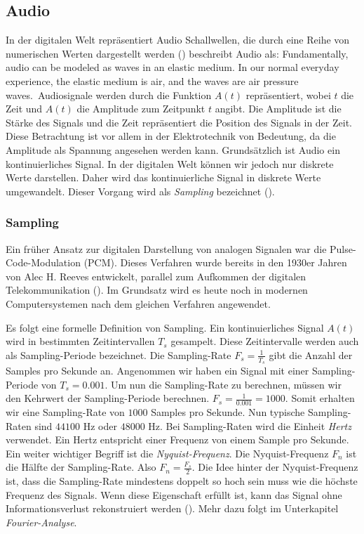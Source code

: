 \documentclass[11pt,a4paper]{article}
\begin{document}
\subsection{Audio}
In der digitalen Welt repräsentiert Audio Schallwellen, die durch eine Reihe von numerischen Werten
dargestellt werden (\cite[p.9]{somberg2019audioapi}) beschreibt Audio als: \glqq Fundamentally,
audio can be modeled as waves in an elastic medium. In our normal everyday experience, the elastic
medium is air, and the waves are air pressure waves.\grqq \ Audiosignale werden durch die Funktion
\(A(t)\) repräsentiert, wobei \(t\) die Zeit und \(A(t)\) die Amplitude zum
Zeitpunkt \(t\) angibt. Die Amplitude ist die Stärke des Signals und die Zeit repräsentiert die
Position des Signals in der Zeit. Diese Betrachtung ist vor allem in der Elektrotechnik
von Bedeutung, da die Amplitude als Spannung angesehen werden kann. Grundsätzlich ist Audio ein
kontinuierliches Signal. In der digitalen Welt können wir jedoch nur diskrete Werte darstellen.
Daher wird das kontinuierliche Signal in diskrete Werte umgewandelt. Dieser Vorgang wird als
\textit{Sampling} bezeichnet (\cite[Chapter~3.1]{tarr2018hackaudio}).


\subsubsection{Sampling}
Ein früher Ansatz zur digitalen Darstellung von analogen Signalen war die Pulse-Code-Modulation
(PCM). Dieses Verfahren wurde bereits in den 1930er Jahren von Alec H. Reeves entwickelt,
parallel zum Aufkommen der digitalen Telekommunikation (\cite[p.~57]{deloraine1965pcm}).
Im Grundsatz wird es heute noch in modernen Computersystemen nach dem gleichen Verfahren angewendet.

\noindent \newline
Es folgt eine formelle Definition von Sampling. Ein kontinuierliches Signal \(A(t)\)
wird in bestimmten Zeitintervallen \(T_s\) gesampelt. Diese Zeitintervalle werden auch als
Sampling-Periode bezeichnet. Die Sampling-Rate \(F_s = \displaystyle\frac{1}{T_s}\) gibt die Anzahl
der Samples pro Sekunde an. Angenommen wir haben ein Signal mit einer Sampling-Periode
von \(T_s = 0.001\). Um nun die Sampling-Rate zu berechnen, müssen wir den Kehrwert der
Sampling-Periode berechnen. \(F_s = \displaystyle\frac{1}{0.001} = 1000\). Somit erhalten wir eine
Sampling-Rate von \(1000\) Samples pro Sekunde. Nun typische Sampling-Raten sind \(44100\) Hz
oder \(48000\) Hz. Bei Sampling-Raten wird die Einheit \textit{Hertz} verwendet. Ein Hertz entspricht
einer Frequenz von einem Sample pro Sekunde. Ein weiter wichtiger Begriff ist die
\textit{Nyquist-Frequenz}. Die Nyquist-Frequenz \(F_n\) ist die Hälfte der Sampling-Rate.
Also \(F_n = \displaystyle\frac{F_s}{2}\). Die Idee hinter der Nyquist-Frequenz ist, dass die
Sampling-Rate mindestens doppelt so hoch sein muss wie die höchste Frequenz des Signals. Wenn diese
Eigenschaft erfüllt ist, kann das Signal ohne Informationsverlust rekonstruiert werden
(\cite[Chapter~3.1]{tarr2018hackaudio}). Mehr dazu folgt im Unterkapitel
\textit{Fourier-Analyse}.
\end{document}
